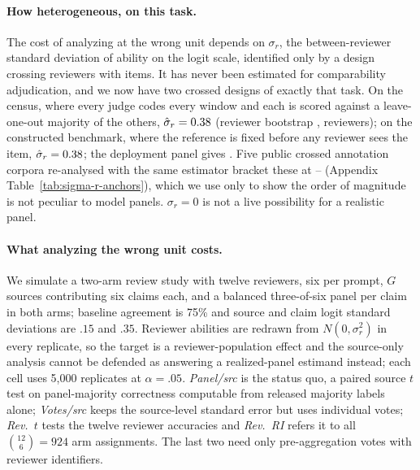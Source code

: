 \documentclass[11pt]{article}
\begin{document}
\paragraph{How heterogeneous, on this task.}
The cost of analyzing at the wrong unit depends on $\sigma_r$, the
between-reviewer standard deviation of ability on the logit scale, identified
only by a design crossing reviewers with items. It has never been estimated for
comparability adjudication, and we now have two crossed designs of exactly that
task. On the census, where every judge codes every window and each is scored
against a leave-one-out majority of the others, $\hat\sigma_r=0.38$
(reviewer bootstrap \SigmaCensusCI{}, \SigmaCensusRev{} reviewers); on the
constructed benchmark, where the reference is fixed before any reviewer sees the
item, $\hat\sigma_r=0.38{}$; the deployment panel gives
\SigmaPanel{}. Five public crossed annotation corpora re-analysed with the same
estimator bracket these at \SigmaMin{}--\SigmaMax{} (Appendix
Table~\ref{tab:sigma-r-anchors}), which we use only to show the order of
magnitude is not peculiar to model panels. $\sigma_r=0$ is not a live
possibility for a realistic panel.

\paragraph{What analyzing the wrong unit costs.}
We simulate a two-arm review study with twelve reviewers, six per prompt, $G$
sources contributing six claims each, and a balanced three-of-six panel per
claim in both arms; baseline agreement is 75\% and source and claim logit
standard deviations are $.15$ and $.35$. Reviewer abilities are redrawn from
$N(0,\sigma_r^2)$ in every replicate, so the target is a reviewer-population
effect and the source-only analysis cannot be defended as answering a
realized-panel estimand instead; each cell uses 5{,}000 replicates at
$\alpha=.05$. \emph{Panel/src} is the status quo, a paired source $t$ test on
panel-majority correctness computable from released majority labels alone;
\emph{Votes/src} keeps the source-level standard error but uses individual
votes; \emph{Rev.\ $t$} tests the twelve reviewer accuracies and \emph{Rev.\ RI}
refers it to all $\binom{12}{6}=924$ arm assignments. The last two need only
pre-aggregation votes with reviewer identifiers.
\end{document}
